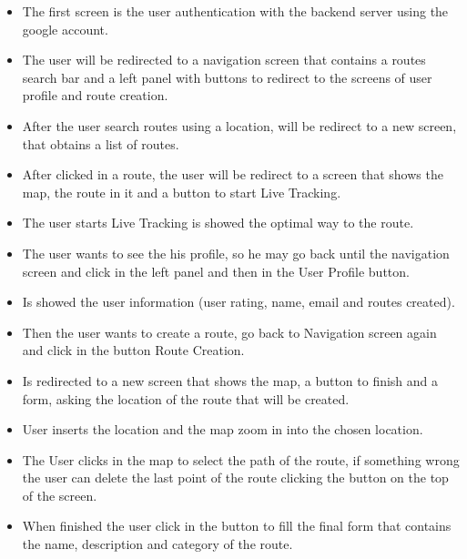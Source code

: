         \begin{itemize}
                \item The first screen is the user authentication with the backend server using the google account.
                \item The user will be redirected to a navigation screen that contains a routes search bar and a left panel with buttons to redirect to the screens of user profile and route creation.
                \item After the user search routes using a location, will be redirect to a new screen, that obtains a list of routes.
                \item After clicked in a route, the user will be redirect to a screen that shows the map, the route in it and a button to start Live Tracking.
                \item The user starts Live Tracking is showed the optimal way to the route.
                \item The user wants to see the his profile, so he may go back until the navigation screen and click in the left panel and then in the User Profile button.
                \item Is showed the user information (user rating, name, email and routes created).
                \item Then the user wants to create a route, go back to Navigation screen again and click in the button Route Creation.
                \item Is redirected to a new screen that shows the map, a button to finish and a form, asking the location of the route that will be created.
                \item User inserts the location and the map zoom in into the chosen location.
                \item The User clicks in the map to select the path of the route, if something wrong the user can delete the last point of the route clicking the button on the top of the screen.
                \item When finished the user click in the button to fill the final form that contains the name, description and category of the route.
        \end{itemize}